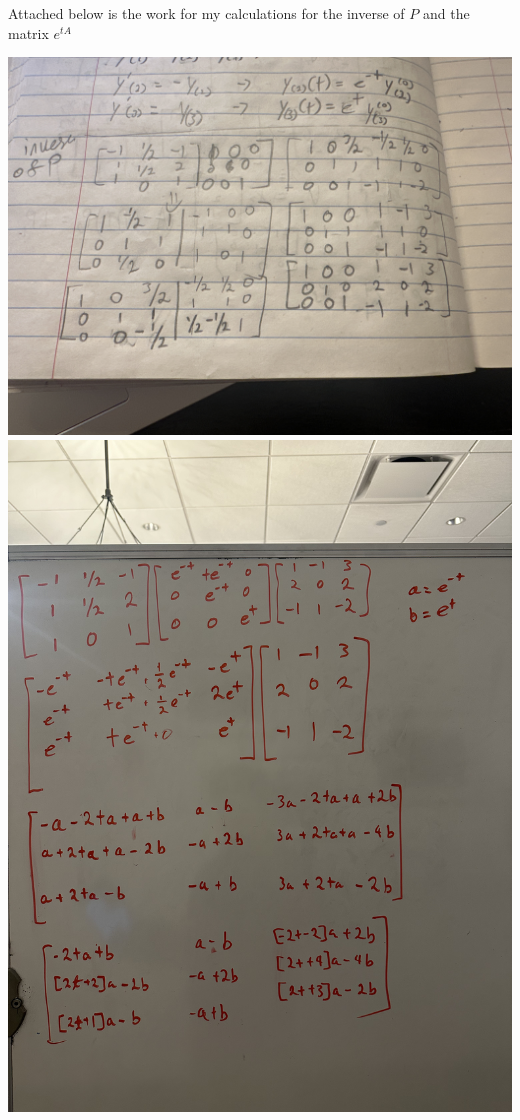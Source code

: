 \documentclass{article}
\begin{document}
Attached below is the work for my calculations for the inverse of $P$ and the matrix $e^{tA}$

\includegraphics[width=\textwidth]{InverseP.JPG}
\includegraphics[width=\textwidth]{e^tA.JPG}
\end{document}
